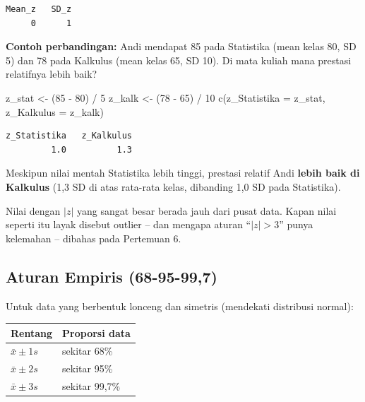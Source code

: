 \documentclass[
  indonesian,
  letterpaper,
]{book}
\newenvironment{Shaded}{\begin{snugshade}}{\end{snugshade}}
\newcommand{\AttributeTok}[1]{\textcolor[rgb]{0.40,0.45,0.13}{#1}}
\newcommand{\DecValTok}[1]{\textcolor[rgb]{0.68,0.00,0.00}{#1}}
\newcommand{\FunctionTok}[1]{\textcolor[rgb]{0.28,0.35,0.67}{#1}}
\newcommand{\NormalTok}[1]{\textcolor[rgb]{0.00,0.23,0.31}{#1}}
\newcommand{\OtherTok}[1]{\textcolor[rgb]{0.00,0.23,0.31}{#1}}
\newcommand{\SpecialCharTok}[1]{\textcolor[rgb]{0.37,0.37,0.37}{#1}}
\newcounter{none} %
\begin{document}
\begin{verbatim}
Mean_z   SD_z 
     0      1 
\end{verbatim}

\textbf{Contoh perbandingan:} Andi mendapat 85 pada Statistika (mean
kelas 80, SD 5) dan 78 pada Kalkulus (mean kelas 65, SD 10). Di mata
kuliah mana prestasi relatifnya lebih baik?

\begin{Shaded}
\begin{Highlighting}[]
\NormalTok{z\_stat }\OtherTok{\textless{}{-}}\NormalTok{ (}\DecValTok{85} \SpecialCharTok{{-}} \DecValTok{80}\NormalTok{) }\SpecialCharTok{/} \DecValTok{5}
\NormalTok{z\_kalk }\OtherTok{\textless{}{-}}\NormalTok{ (}\DecValTok{78} \SpecialCharTok{{-}} \DecValTok{65}\NormalTok{) }\SpecialCharTok{/} \DecValTok{10}
\FunctionTok{c}\NormalTok{(}\AttributeTok{z\_Statistika =}\NormalTok{ z\_stat, }\AttributeTok{z\_Kalkulus =}\NormalTok{ z\_kalk)}
\end{Highlighting}
\end{Shaded}

\begin{verbatim}
z_Statistika   z_Kalkulus 
         1.0          1.3 
\end{verbatim}

Meskipun nilai mentah Statistika lebih tinggi, prestasi relatif Andi
\textbf{lebih baik di Kalkulus} (1,3 SD di atas rata-rata kelas,
dibanding 1,0 SD pada Statistika).

Nilai dengan \(|z|\) yang sangat besar berada jauh dari pusat data.
Kapan nilai seperti itu layak disebut outlier -- dan mengapa aturan
``\(|z| > 3\)'' punya kelemahan -- dibahas pada Pertemuan 6.

\subsection{Aturan Empiris (68-95-99,7)}\label{aturan-empiris-68-95-997}

Untuk data yang berbentuk lonceng dan simetris (mendekati distribusi
normal):

{\def\LTcaptype{none} %
\begin{longtable}[]{@{}ll@{}}
\toprule\noalign{}
Rentang & Proporsi data \\
\midrule\noalign{}
\endhead
\bottomrule\noalign{}
\endlastfoot
\(\bar{x} \pm 1s\) & sekitar 68\% \\
\(\bar{x} \pm 2s\) & sekitar 95\% \\
\(\bar{x} \pm 3s\) & sekitar 99,7\% \\
\end{longtable}
}
\end{document}
